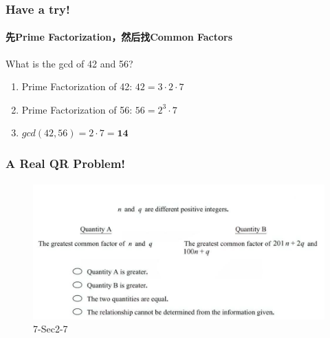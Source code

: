 \documentclass[
	11pt, %
	handout,
]{beamer}
\begin{document}

\begin{frame}
	\frametitle{Have a try!}
	\framesubtitle{先Prime Factorization，然后找Common Factors}
		What is the gcd of 42 and 56?
		 \pause
		 \begin{enumerate}
		 	\item Prime Factorization of 42: $42=3 \cdot 2 \cdot 7$ \pause
		 	\item Prime Factorization of 56: $56=2^3 \cdot 7$ \pause
		 	\item  $gcd(42, 56) = 2 \cdot 7 = \textbf{14}$ 
		 	\end{enumerate}
\end{frame}



\begin{frame}
	\frametitle{A Real QR Problem!}
	\framesubtitle{}
	\begin{figure}
		\includegraphics[width=\linewidth]{GCD_Example_Question.png}
		\caption{7-Sec2-7}
	\end{figure}
\bigskip

\end{frame}

\end{document}
